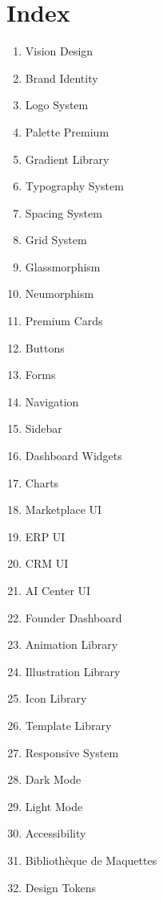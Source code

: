 \documentclass[12pt,a4paper,oneside]{book}
\begin{document}
\appendix

\chapter{Index}
\begin{enumerate}
\item Vision Design
\item Brand Identity
\item Logo System
\item Palette Premium
\item Gradient Library
\item Typography System
\item Spacing System
\item Grid System
\item Glassmorphism
\item Neumorphism
\item Premium Cards
\item Buttons
\item Forms
\item Navigation
\item Sidebar
\item Dashboard Widgets
\item Charts
\item Marketplace UI
\item ERP UI
\item CRM UI
\item AI Center UI
\item Founder Dashboard
\item Animation Library
\item Illustration Library
\item Icon Library
\item Template Library
\item Responsive System
\item Dark Mode
\item Light Mode
\item Accessibility
\item Bibliothèque de Maquettes
\item Design Tokens
\end{enumerate}
\end{document}
